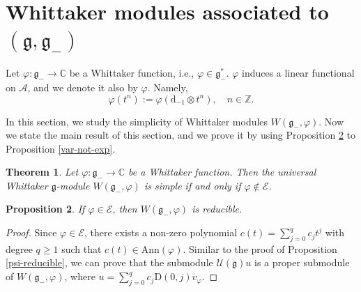 \documentclass[12pt, a4paper]{amsart}
\newcommand{\fg}{\mathfrak g}
\newcommand{\C}{\mathbb{C}}
\newcommand{\Z}{\mathbb Z}
\newcommand{\rd}{\mathrm{d}}
\newcommand{\rD}{\mathrm{D}}
\newcommand{\U}{\mathcal{U}}
\theoremstyle{Theorem}
\theoremstyle{Theorem}
\newtheorem{thm}{Theorem}[section]
\newtheorem{proposition}[thm]{Proposition}
\numberwithin{equation}{section}
\begin{document}
\section{Whittaker modules associated to $(\fg,\fg_{-})$}
Let $\varphi:\fg_{-}\rightarrow\C$ be a Whittaker function, i.e., $\varphi\in\fg_{-}^{*}$.
$\varphi$ induces a linear functional on $\mathcal{A}$, and we denote it also by $\varphi$. Namely,
\[\varphi(t^{n}):=\varphi(\rd_{-1}\otimes t^{n}),\quad n\in\Z.\]

In this section, we study the simplicity of Whittaker modules $W(\fg_{-},\varphi)$.
Now we state the main result of this section, and we prove it
by using Proposition \ref{E-Reducible} to Proposition \ref{var-not-exp}.
\begin{thm}\label{second-main-restlt}Let $\varphi:\fg_{-}\rightarrow\C$ be a Whittaker function.
Then the universal Whittaker $\fg$-module $W(\fg_{-},\varphi)$ is simple if and only if $\varphi\notin\mathcal{E}$.
\end{thm}

\begin{proposition}\label{E-Reducible}
If $\varphi\in\mathcal{E}$, then $W(\fg_{-},\varphi)$ is reducible.
\end{proposition}
\begin{proof}
Since $\varphi\in\mathcal{E}$, there exists a non-zero polynomial
$c(t)=\sum_{j=0}^{q}c_{j}t^{j}$ with degree $q\geq1$ such that
$c(t)\in\mathrm{Ann}(\varphi)$. Similar to the proof of Proposition \ref{psi-reducible},
we can prove that the submodule $\U(\fg)u$ is a proper submodule of $W(\fg_{-},\varphi)$,
where $u=\sum_{j=0}^{q}c_{j}\rD(0,j)v_{\varphi}$.
\end{proof}
\end{document}

